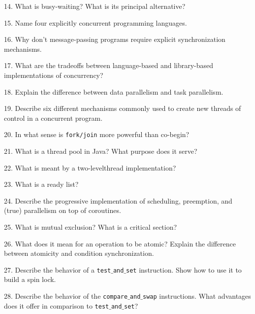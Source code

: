 14. What is busy-waiting? What is its principal alternative?

\filbreak
\vskip 1cm

15. Name four explicitly concurrent programming languages.

\filbreak
\vskip 1cm

16. Why don't message-passing programs require explicit synchronization mechanisms.

\filbreak
\vskip 1cm

17. What are the tradeoffs between language-based and library-based implementations of concurrency?

\filbreak
\vskip 1cm

18. Explain the difference between data parallelism and task parallelism.

\filbreak
\vskip 1cm

19. Describe six different mechanisms commonly used to create new threads of control in a concurrent program.

\filbreak
\vskip 1cm

20. In what sense is {\tt fork/join} more powerful than co-begin?

\filbreak
\vskip 1cm

21. What is a thread pool in Java? What purpose does it serve?

\filbreak
\vskip 1cm

22. What is meant by a two-levelthread implementation?

\filbreak
\vskip 1cm

23. What is a ready list?

\filbreak
\vskip 1cm

24. Describe the progressive implementation of scheduling, preemption, and (true) parallelism on top of coroutines.

\filbreak
\vskip 1cm

25. What is mutual exclusion? What is a critical section?

\filbreak
\vskip 1cm

26. What does it mean for an operation to be atomic? Explain the difference between atomicity and condition synchronization.

\filbreak
\vskip 1cm

27. Describe the behavior of a {\tt test$\_$and$\_$set} instruction. Show how to use it to build a spin lock.

\filbreak
\vskip 1cm

28. Describe the behavior of the {\tt compare$\_$and$\_$swap} instructions. What advantages does it offer in comparison to {\tt test$\_$and$\_$set}?

